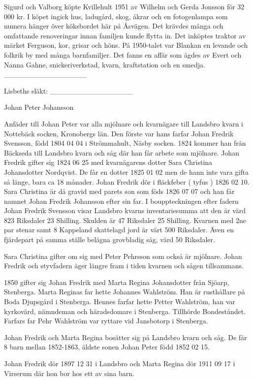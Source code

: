 Sigurd och Valborg köpte Kvillehult 1951 av Wilhelm och Gerda Jonsson för 32 000 kr. I köpet ingick hus, ladugård, skog, åkrar och en fotogenlampa som numera hänger över köksbordet här på Åsvägen. Det krävdes många och omfattande renoveringar innan familjen kunde flytta in. Det inköptes traktor av märket Ferguson, kor, grisar och höns.
På 1950-talet var Blankan en levande och folkrik by med många  barnfamiljer. Det fanns en affär som ägdes av Evert och Nanna Gahne, snickeriverkstad, kvarn, kraftstation och en smedja.
________________


Lisbeths släkt:
________________


Johan Peter Johansson


Anfäder till Johan Peter var alla mjölnare och kvarnägare till Landsbro kvarn i Nottebäck socken, Kronobergs län. Den förste var hans farfar Johan Fredrik Svensson, född 1804 04 04 i Strömmahult, Näsby socken. 1824 kommer han från Bäckseda till Landsbro kvarn och såg där han får arbete som mjölnare. Johan Fredrik gifter sig 1824 06 25 med kvarnägarens dotter Sara Christina Johansdotter Nordqvist. De får en dotter 1825 01 02 men de hann inte vara gifta så länge, bara ca 18 månader. Johan Fredrik dör i fläckfeber ( tyfus ) 1826 02 10. Sara Christina är då gravid med parets son som föds 1826 07 07 och han får namnet Johan Fredrik Johansson efter sin far.
I bouppteckningen efter fadern Johan Fredrik Svensson visar Landsbro kvarns inventariesumma att den är värd 823 Riksdaler 23 Shilling. Skulden är 47 Riksdaler 25 Shilling. Kvarnen med 2ne par stenar samt 8 Kappeland skattelagd jord är värt 500 Riksdaler. Även en fjärdepart på samma ställe belägna grovbladig såg, värd 50 Riksdaler.


Sara Christina gifter om sig med Peter Pehrsson som också är mjölnare. Johan Fredrik och styvfadern äger längre fram i tiden kvarnen och sågen tillsammans.


1850 gifter sig Johan Fredrik med Marta Regina Johansdotter från Sjöarp, Stenberga.
Marta Reginas far hette Johannes Wahlström. Han är rusthållare på Boda Djupsgård i Stenberga. Hennes farfar hette Petter Wahlström, han var kyrkovärd, nämndeman och häradsdomare i Stenberga. Tillhörde Bondeståndet. Farfars far Pehr Wahlström var ryttare vid Jansbotorp i Stenberga.


Johan Fredrik och Marta Regina bosätter sig på Landsbro kvarn och såg. De får 8 barn mellan 1852-1863, äldste sonen Johan Peter född 1852 02 15. 


Johan Fredrik dör 1897 12 31 i Landsbro och Marta Regina dör 1911 09 17 i Virserum där hon bor hos ett av sina barn.








